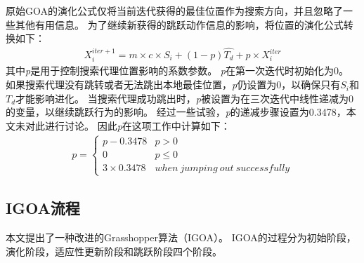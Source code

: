 原始GOA的演化公式仅将当前迭代获得的最佳位置作为搜索方向，并且忽略了一些其他有用信息。 为了继续新获得的跳跃动作信息的影响，将位置的演化公式转换如下：
\begin{eqnarray}
	X_i^{iter+1}=m\times c\times S_i+(1-p)\widehat{T_d}+p\times X_i^{iter}
\end{eqnarray}
其中\emph{p}是用于控制搜索代理位置影响的系数参数。 \emph{p}在第一次迭代时初始化为0。 如果搜索代理没有跳转或者无法跳出本地最佳位置，\emph{p}仍设置为0，以确保只有$ S_i $和$ T_d $才能影响进化。 当搜索代理成功跳出时，\emph{p}被设置为在三次迭代中线性递减为0的变量，以继续跳跃行为的影响。 经过一些试验，\emph{p}的递减步骤设置为0.3478，本文未对此进行讨论。 因此\emph{p}在这项工作中计算如下：
\begin{eqnarray}
    p= \begin{cases}
        p-0.3478 & p>0 \\
        0&p \leq 0 \\
        3\times 0.3478&when \  jumping \  out \  successfully
        \end{cases} 
\end{eqnarray}
\subsection{IGOA流程}
本文提出了一种改进的Grasshopper算法（IGOA）。 IGOA的过程分为初始阶段，演化阶段，适应性更新阶段和跳跃阶段四个阶段。

